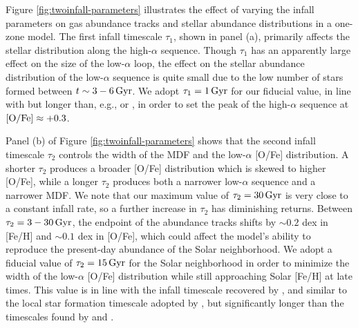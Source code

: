 \documentclass[twocolumn,twocolappendix,linenumbers]{aastex631}
\newcommand{\todo}[1]{{\color{red}#1}}
\begin{document}
Figure \ref{fig:twoinfall-parameters} illustrates the effect of varying the infall parameters on gas abundance tracks and stellar abundance distributions in a one-zone model. The first infall timescale $\tau_1$, shown in panel (a), primarily affects the stellar distribution along the high-$\alpha$ sequence. Though $\tau_1$ has an apparently large effect on the size of the low-$\alpha$ loop, the effect on the stellar abundance distribution of the low-$\alpha$ sequence is quite small due to the low number of stars formed between $t\sim3-6\,{\rm Gyr}$. We adopt $\tau_1=1\,{\rm Gyr}$ for our fiducial value, in line with \citet{spitoni_galactic_2020} but longer than, e.g., \citet{nissen_high-precision_2020} or \citet{spitoni_apogee_2021}, in order to set the peak of the high-$\alpha$ sequence at ${\rm [O/Fe]}\approx+0.3$. 

Panel (b) of Figure \ref{fig:twoinfall-parameters} shows that 
the second infall timescale $\tau_2$ controls the width of the MDF and the low-$\alpha$ [O/Fe] distribution. A shorter $\tau_2$ produces a broader [O/Fe] distribution which is skewed to higher [O/Fe], while a longer $\tau_2$ produces both a narrower low-$\alpha$ sequence and a narrower MDF. We note that our maximum value of $\tau_2=30\,{\rm Gyr}$ is very close to a constant infall rate, so a further increase in $\tau_2$ has diminishing returns. Between $\tau_2=3-30\,{\rm Gyr}$, the endpoint of the abundance tracks shifts by $\sim0.2$ dex in [Fe/H] and $\sim0.1$ dex in [O/Fe], which could affect the model's ability to reproduce the present-day abundance of the Solar neighborhood. We adopt a fiducial value of $\tau_2=15\,{\rm Gyr}$ for the Solar neighborhood in order to minimize the width of the low-$\alpha$ [O/Fe] distribution while still approaching Solar [Fe/H] at late times. This value is in line with the infall timescale recovered by \citet{spitoni_galactic_2020}, and similar to the local star formation timescale adopted by \citet{johnson_stellar_2021}, but significantly longer than the timescales found by \citet{nissen_high-precision_2020} and \citet{spitoni_apogee_2021}. 
\end{document}
